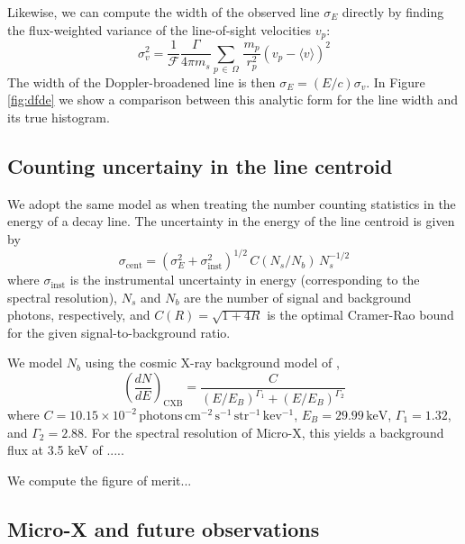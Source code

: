 \documentclass[aps,prl,10pt,twocolumn,superscriptaddress,showpacs]{revtex4-1}
\begin{document}
Likewise, we can compute the width of the observed line $\sigma_E$ directly by finding the flux-weighted
variance of the line-of-sight velocities $v_p$:
\begin{equation} 
	\sigma_v^2 =\frac{1}{\mathcal{F}} \frac{\Gamma}{4\pi m_s} \sum_{p \, \in \, \Omega}
	\, \frac{m_p}{r_p^{2}} \left(v_p-\langle v\rangle\right)^2 
\label{eq:simsigma}
\end{equation}
The width of the Doppler-broadened line is then $\sigma_E = (E/c) \sigma_v$. In Figure \ref{fig:dfde} we show a comparison 
between this analytic form for the line width and its true histogram.


\subsection{Counting uncertainy in the line centroid}

We adopt the same model as \cite{speckhard2016} when treating the number counting statistics in the
energy of a decay line. The uncertainty in the energy of the line centroid is given by
\begin{equation} 
	\sigma_\mathrm{cent} = (\sigma_E^2 + \sigma_\mathrm{inst}^2)^{1/2} \, C(N_s/N_b) \, N_s^{-1/2}
\label{eq:stats}
\end{equation}
where $\sigma_\mathrm{inst}$ is the instrumental uncertainty in energy (corresponding to the spectral
resolution), $N_s$ and $N_b$ are the number of signal and background photons, respectively, and
$C(R)=\sqrt{1+4R}$ is the optimal Cramer-Rao bound \cite{} for the given signal-to-background ratio.

We model $N_b$ using the cosmic X-ray background model of \cite{ajello2008},
$$
\left( \frac{dN}{dE} \right)_\mathrm{CXB} = \frac{C}{(E/E_B)^{\Gamma_1}+(E/E_B)^{\Gamma_2}}
$$
where $C=10.15\times 10^{-2} \, \mathrm{photons\,cm^{-2}\,s^{-1}\,str^{-1}\,kev^{-1}}$,
$E_B=29.99\,\mathrm{keV}$,
$\Gamma_1=1.32$, and $\Gamma_2=2.88$. For the spectral resolution of Micro-X, this yields a
background flux at 3.5 keV of .....

We compute the figure of merit... 


\subsection{Micro-X and future observations}
\end{document}
